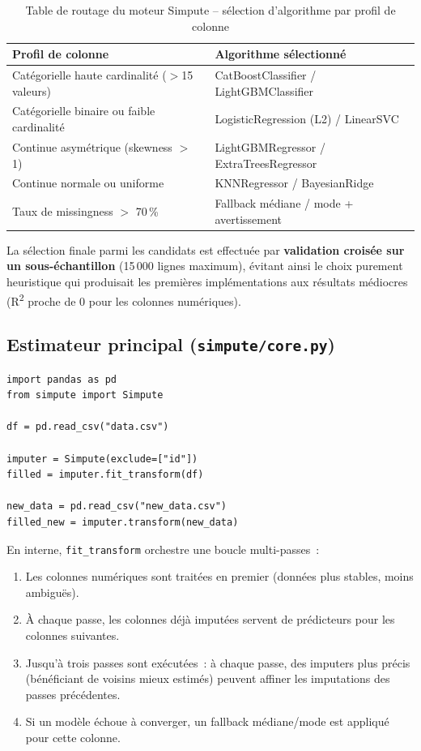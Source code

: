 \documentclass[12pt,a4paper]{report}
\begin{document}
\begin{table}[H]
\centering
\caption{Table de routage du moteur Simpute -- sélection d'algorithme par profil de colonne}
\label{tab:simpute_routing}
\begin{tabularx}{\textwidth}{L{5.5cm}X}
\toprule
\textbf{Profil de colonne} & \textbf{Algorithme sélectionné} \\
\midrule
Catégorielle haute cardinalité ($>$15 valeurs) & CatBoostClassifier / LightGBMClassifier \\
Catégorielle binaire ou faible cardinalité & LogisticRegression (L2) / LinearSVC \\
Continue asymétrique (skewness $>$ 1) & LightGBMRegressor / ExtraTreesRegressor \\
Continue normale ou uniforme & KNNRegressor / BayesianRidge \\
Taux de missingness $>$ 70\,\% & Fallback médiane / mode + avertissement \\
\bottomrule
\end{tabularx}
\end{table}

La sélection finale parmi les candidats est effectuée par \textbf{validation croisée sur un sous-échantillon} (15\,000 lignes maximum), évitant ainsi le choix purement heuristique qui produisait les premières implémentations aux résultats médiocres (R\textsuperscript{2} proche de 0 pour les colonnes numériques).

\subsection{Estimateur principal (\texttt{simpute/core.py})}

\begin{lstlisting}[caption={Interface publique de Simpute -- API compatible scikit-learn}]
import pandas as pd
from simpute import Simpute

df = pd.read_csv("data.csv")

imputer = Simpute(exclude=["id"])
filled = imputer.fit_transform(df)

new_data = pd.read_csv("new_data.csv")
filled_new = imputer.transform(new_data)
\end{lstlisting}

En interne, \texttt{fit\_transform} orchestre une boucle multi-passes~:
\begin{enumerate}
  \item Les colonnes numériques sont traitées en premier (données plus stables, moins ambiguës).
  \item À chaque passe, les colonnes déjà imputées servent de prédicteurs pour les colonnes suivantes.
  \item Jusqu'à trois passes sont exécutées~: à chaque passe, des imputers plus précis (bénéficiant de voisins mieux estimés) peuvent affiner les imputations des passes précédentes.
  \item Si un modèle échoue à converger, un fallback médiane/mode est appliqué pour cette colonne.
\end{enumerate}
\end{document}
